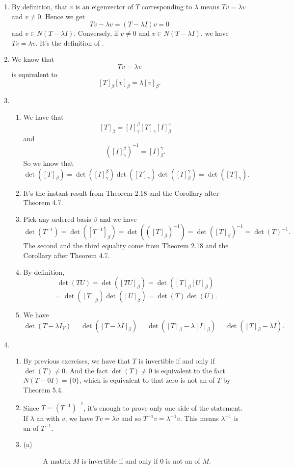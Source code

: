 \begin{enumerate}
\begin{enumerate}
\end{enumerate}
\item By definition, that $v$ is an eigenvector of $T$ corresponding to $\lambda $ means $Tv=\lambda v$ and $v\neq 0$. Hence we get 
\[Tv-\lambda v=(T-\lambda I)v=0\] 
and $v\in N(T-\lambda I)$. Conversely, if $v\neq 0$ and $v\in N(T-\lambda I)$, we have $Tv=\lambda v$. It's the definition of \egve .
\item We know that 
\[Tv=\lambda v\]
is equivalent to 
\[[T]_{\beta }[v]_{\beta}=\lambda [v]_{\beta}.\]
\item \begin{enumerate}
\item We have that 
\[[T]_{\beta}=[I]_{\gamma}^{\beta}[T]_{\gamma}[I]_{\beta}^{\gamma}\]
and 
\[([I]_{\gamma}^{\beta})^{-1}=[I]_{\beta}^{\gamma}.\]
So we know that 
\[\det([T]_{\beta})=\det([I]_{\gamma}^{\beta})\det([T]_{\gamma})\det([I]_{\beta}^{\gamma})=\det([T]_{\gamma}).\]
\item It's the instant result from Theorem 2.18 and the Corollary after Theorem 4.7.
\item Pick any ordered basis $\beta $ and we have 
\[\det(T^{-1})=\det([T^{-1}]_{\beta})=\det(([T]_{\beta})^{-1})=\det([T]_{\beta})^{-1}=\det(T)^{-1}.\]
The second and the third equality come from Theorem 2.18 and the Corollary after Theorem 4.7.
\item By definition,
\[\det(TU)=\det([TU]_{\beta})=\det([T]_{\beta}[U]_{\beta})\]
\[=\det([T]_{\beta})\det([U]_{\beta})=\det(T)\det(U).\]
\item We have 
\[\det(T-\lambda I_V)=\det([T-\lambda I]_{\beta})=\det([T]_{\beta}-\lambda[I]_{\beta})=\det([T]_{\beta}-\lambda I).\]
\end{enumerate}
\item \begin{enumerate}
\item By previous exercises, we have that $T$ is invertible if and only if $\det(T)\neq 0$. And the fact $\det(T)\neq 0$ is equivalent to the fact $N(T-0I)=\{0\}$, which is equivalent to that zero is not an \egva{} of $T$ by Theorem 5.4.
\item Since $T=(T^{-1})^{-1}$, it's enough to prove only one side of the statement. If $\lambda $ an \egva{} with \egve{} $v$, we have $Tv=\lambda v$ and so $T^{-1}v=\lambda^{-1}v$. This means $\lambda^{-1}$ is an \egva{} of $T^{-1}$.
\item \begin{description}
\item[(a)] A matrix $M$ is invertible if and only if $0$ is not an \egva{} of $M$.

\end{description}
\end{enumerate}
\end{enumerate}

